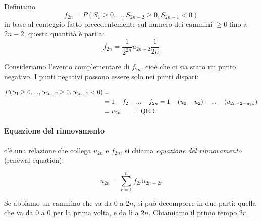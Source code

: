 \documentclass[a4paper,12pt]{book}
\begin{document}
Definiamo 
$$ f_{2n} = P(S_1 \ge 0, ..., S_{2n-2} \ge 0, S_{2n-1} < 0) $$
in base al conteggio fatto precedentemente sul numero dei cammini $ \ge 0 $ fino a $ 2n-2 $, questa quantità è pari a:
$$  f_{2n} = \frac{1}{2^{2n}} u_{2n-2} \frac{1}{2n} $$

Consideriamo l'evento complementare di $ f_{2n} $, cioè che ci sia stato un punto negativo. I punti negativi possono essere solo nei punti dispari:

\begin{align*}
 P(S_1 \ge 0, ..., S_{2n-2} \ge 0, S_{2n-1} < 0) & = \\
 & = 1 - f_2 - ... - f_{2n} = 1 - (u_0 - u_2) - ... - (u_{2n-2 - u_{2n}}) \\
 & = u_{2n} \qed \text{ QED }
\end{align*}

\paragraph{Equazione del rinnovamento} c'è una relazione che collega $ u_{2n} $ e $ f_{2n} $, si chiama \textit{equazione del rinnovamento} (renewal equation):

$$ u_{2n} = \sum_{r = 1}^{n} f_{2r} u_{2n-2r} $$

\begin{multicols}{2}
	Se abbiamo un cammino che va da 0 a $ 2n $, si può decomporre in due parti: quella che va da 0 a 0 per la prima volta, e da lì a $ 2n $. Chiamiamo il primo tempo $ 2r $. 
	
	
\end{multicols}
\end{document}
